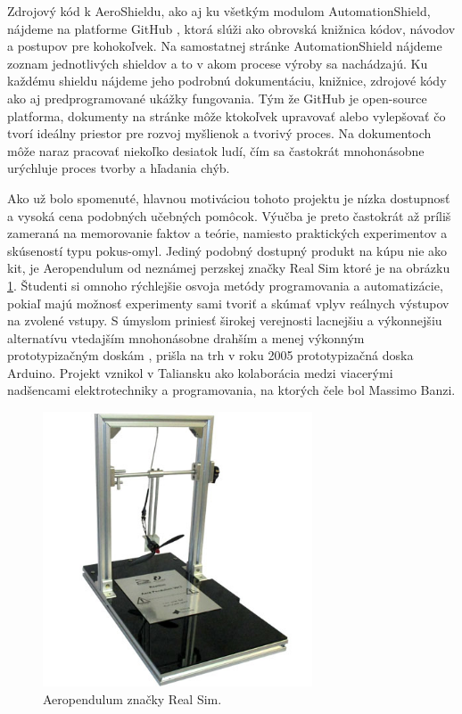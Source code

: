 Zdrojový kód k AeroShieldu, ako aj ku všetkým modulom AutomationShield, nájdeme na platforme GitHub \cite{Git}, ktorá slúži ako obrovská knižnica kódov, návodov a postupov pre kohokoľvek. Na samostatnej stránke AutomationShield nájdeme zoznam jednotlivých shieldov a to v akom procese výroby sa nachádzajú. Ku každému shieldu nájdeme jeho podrobnú dokumentáciu, knižnice, zdrojové kódy ako aj predprogramované ukážky fungovania. Tým že GitHub je open-source platforma, dokumenty na stránke môže ktokoľvek upravovať alebo vylepšovať čo tvorí ideálny priestor pre rozvoj myšlienok a tvorivý proces. Na dokumentoch môže naraz pracovať niekoľko desiatok ludí, čím sa častokrát mnohonásobne urýchluje proces tvorby a hľadania chýb. 

Ako už bolo spomenuté, hlavnou motiváciou tohoto projektu je nízka dostupnosť a vysoká cena podobných učebných pomôcok. Výučba je preto častokrát až príliš zameraná na memorovanie faktov a teórie, namiesto praktických experimentov a skúseností typu pokus-omyl. Jediný podobný dostupný produkt na kúpu nie ako kit, je Aeropendulum od neznámej perzskej značky Real Sim ktoré je na obrázku \ref{OBRAZOK 1.2}. Študenti si omnoho rýchlejšie osvoja metódy programovania a automatizácie, pokiaľ majú možnosť experimenty sami tvoriť a skúmať vplyv reálnych výstupov na zvolené vstupy. S úmyslom priniesť širokej verejnosti lacnejšiu a výkonnejšiu alternatívu vtedajším mnohonásobne drahším a menej výkonným prototypizačným doskám \cite{stamp}, prišla na trh v roku 2005 prototypizačná doska Arduino. Projekt vznikol v Taliansku ako kolaborácia medzi viacerými nadšencami elektrotechniky a programovania, na ktorých čele bol Massimo Banzi.

\begin{figure}[!tbh]
\centering
\includegraphics[width=80mm]{obr/pendulum.jpg}
\caption{Aeropendulum značky Real Sim.}\label{OBRAZOK 1.2}
\end{figure}

